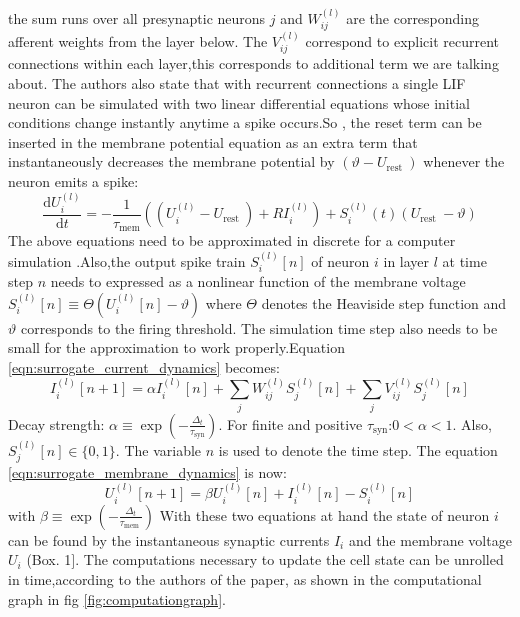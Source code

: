 \documentclass[12pt]{report}
\begin{document}
the sum runs over all presynaptic neurons $j$ and $W_{i j}^{(l)}$ are the corresponding afferent weights from the layer below. The $V_{i j}^{(l)}$ correspond to explicit recurrent connections within each layer,this corresponds to additional term we are talking about. The authors also state that with recurrent connections a single LIF neuron can be simulated with two linear differential equations whose initial conditions change instantly anytime a spike occurs.So , the reset term can be inserted in the membrane potential equation as an extra term that instantaneously decreases the membrane potential by $\left(\vartheta-U_{\text {rest }}\right)$ whenever the neuron emits a spike:
\begin{equation}
\label{eqn:surrogate_membrane_dynamics}
\frac{\mathrm{d} U_{i}^{(l)}}{\mathrm{d} t}=-\frac{1}{\tau_{\mathrm{mem}}}\left(\left(U_{i}^{(l)}-U_{\text {rest }}\right)+R I_{i}^{(l)}\right)+S_{i}^{(l)}(t)\left(U_{\text {rest }}-\vartheta\right)
\end{equation}
The above equations need to be approximated in discrete for a computer simulation .Also,the output spike train $S_{i}^{(l)}[n]$ of neuron $i$ in layer $l$ at time step $n$ needs to expressed as a nonlinear function of the membrane voltage $S_{i}^{(l)}[n] \equiv \Theta\left(U_{i}^{(l)}[n]-\vartheta\right)$ where $\Theta$ denotes the Heaviside step function and $\vartheta$ corresponds to the firing threshold. The simulation time step also needs to be small for the approximation to work properly.Equation \ref{eqn:surrogate_current_dynamics} becomes:
\begin{equation}
I_{i}^{(l)}[n+1]=\alpha I_{i}^{(l)}[n]+\sum_{j} W_{i j}^{(l)} S_{j}^{(l)}[n]+\sum_{j} V_{i j}^{(l)} S_{j}^{(l)}[n]
\end{equation}
Decay strength: $\alpha \equiv \exp \left(-\frac{\Delta_{t}}{\tau_{\mathrm{syn}}}\right) .$  For finite and positive $\tau_{\mathrm{syn}}$:$0<\alpha<1$. Also, $S_{j}^{(l)}[n] \in\{0,1\} .$ The variable $n$ is used to denote the time step. The equation \ref{eqn:surrogate_membrane_dynamics} is now:
\begin{equation}
U_{i}^{(l)}[n+1]=\beta U_{i}^{(l)}[n]+I_{i}^{(l)}[n]-S_{i}^{(l)}[n]
\end{equation}
with $\beta \equiv \exp \left(-\frac{\Delta_{t}}{\tau_{\text {mem }}}\right)$
With these two equations at hand the state of neuron $i$ can be found by the instantaneous synaptic currents $I_{i}$ and the membrane voltage $U_{i}$ (Box. 1$] .$ The computations necessary to update the cell state can be unrolled in time,according to the authors of the paper, as shown in the computational graph in fig \ref{fig:computationgraph}.
\end{document}
